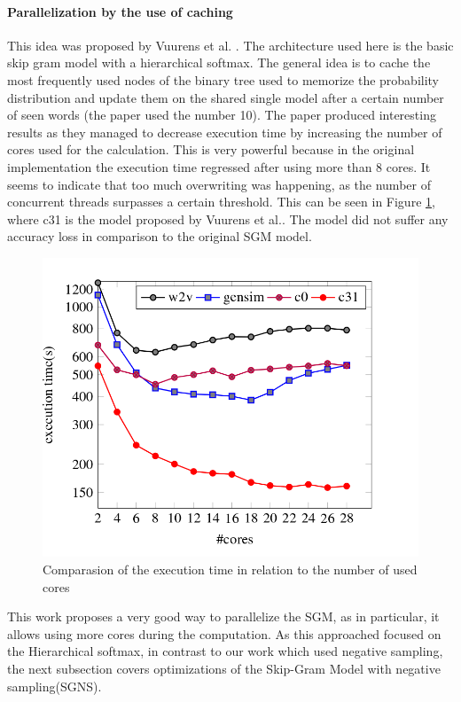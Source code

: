 \documentclass[conference]{IEEEtran}
\begin{document}
\paragraph{Parallelization by the use of caching}
This idea was proposed by Vuurens et al. \cite{efficient}. The architecture used here is the basic skip gram model with a hierarchical softmax. The general idea is to cache the most frequently used nodes of the binary tree used to memorize the probability distribution and update them on the shared single model after a certain number of seen words (the paper used the number 10). The paper produced interesting results as they managed to decrease execution time by increasing the number of cores used for the calculation. This is very powerful because in the original implementation the execution time regressed after using more than 8 cores. It seems to indicate that too much overwriting was happening, as the number of concurrent threads surpasses a certain threshold. This can be seen in Figure \ref{fig:efficient}, where c31 is the model proposed by Vuurens et al.\cite{efficient}. The model did not suffer any accuracy loss in comparison to the original SGM model.
\begin{figure}[ht]
\centering
\includegraphics[scale=0.3]{images/cachingEfficiency.png}
\caption{Comparasion of the execution time in relation to the number of used cores \cite{efficient}}
\label{fig:efficient}
\end{figure}
This work proposes a very good way to parallelize the SGM, as in particular, it allows using more cores during the computation. As this approached focused on the Hierarchical softmax, in contrast to our work which used negative sampling, the next subsection covers optimizations of the Skip-Gram Model with negative sampling(SGNS).
\end{document}
